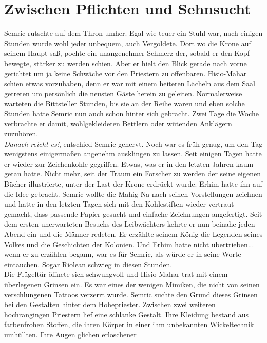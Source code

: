 \chapter{Zwischen Pflichten und Sehnsucht}

Semric rutschte auf dem Thron umher. Egal wie teuer ein Stuhl war, nach einigen Stunden wurde wohl 
jeder unbequem, auch Vergoldete. Dort wo die Krone auf seinem Haupt saß, pochte ein unangenehmer 
Schmerz der, sobald er den Kopf bewegte, stärker zu werden schien. Aber er hielt den Blick gerade 
nach vorne gerichtet um ja keine Schwäche vor den Priestern zu offenbaren. Hisio-Mahar schien etwas 
vorzuhaben, denn er war mit einem heiteren Lächeln aus dem Saal getreten um persönlich die neusten 
Gäste herein zu geleiten. Normalerweise warteten die Bittsteller Stunden, bis sie an der Reihe 
waren und eben solche Stunden hatte Semric nun auch schon hinter sich gebracht. Zwei Tage die Woche 
verbrachte er damit, wohlgekleideten Bettlern oder wütenden Anklägern zuzuhören.\\
\textit{Danach reicht es!}, entschied Semric genervt. Noch war es früh genug, um den Tag wenigstens 
einigermaßen angenehm ausklingen zu lassen. Seit einigen Tagen hatte er wieder zur Zeichenkohle 
gegriffen. Etwas, was er in den letzten Jahren kaum getan hatte. Nicht mehr, seit der Traum ein 
Forscher zu werden der seine eigenen Bücher illustrierte, unter der Last der Krone erdrückt wurde. 
Erhim hatte ihn auf die Idee gebracht. Semric wollte die Mahig-Na nach seinen Vorstellungen 
zeichnen und hatte in den letzten Tagen sich mit den Kohlestiften wieder vertraut gemacht, dass 
passende Papier gesucht und einfache Zeichnungen angefertigt. Seit dem ersten unerwarteten Besuchs 
des Leibwächters kehrte er nun beinahe jeden Abend ein und die Männer redeten. Er erzählte seinem 
König die Legenden seines Volkes und die Geschichten der Kolonien. Und Erhim hatte nicht 
übertrieben... wenn er zu erzählen begann, war es für Semric, als würde er in seine Worte 
eintauchen. Sogar Riolean schwieg in diesen Stunden.\\
Die Flügeltür öffnete sich schwungvoll und Hisio-Mahar trat mit einem überlegenen Grinsen ein. Es 
war eines der wenigen Mimiken, die nicht von seinen verschlungenen Tattoos verzerrt wurde. Semric 
suchte den Grund dieses Grinsen bei den Gestalten hinter dem Hohepriester. Zwischen zwei weiteren 
hochrangingen Priestern lief eine schlanke Gestalt. Ihre Kleidung bestand aus farbenfrohen Stoffen, 
die ihren Körper in einer ihm unbekannten Wickeltechnik umhüllten. Ihre Augen glichen erloschener 
